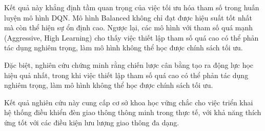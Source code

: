 Kết quả này khẳng định tầm quan trọng của việc tối ưu hóa tham số trong huấn luyện mô hình DQN. Mô hình Balanced không chỉ đạt được hiệu suất tốt nhất mà còn thể hiện sự ổn định cao. Ngược lại, các mô hình với tham số quá mạnh (Aggressive, High Learning) cho thấy việc thiết lập tham số quá cao có thể phản tác dụng nghiêm trọng, làm mô hình không thể học được chính sách tối ưu.

Đặc biệt, nghiên cứu chứng minh rằng chiến lược cân bằng tạo ra động lực học hiệu quả nhất, trong khi việc thiết lập tham số quá cao có thể phản tác dụng nghiêm trọng, làm mô hình không thể học được chính sách tối ưu.

Kết quả nghiên cứu này cung cấp cơ sở khoa học vững chắc cho việc triển khai hệ thống điều khiển đèn giao thông thông minh trong thực tế, với khả năng thích ứng tốt với các điều kiện lưu lượng giao thông đa dạng.